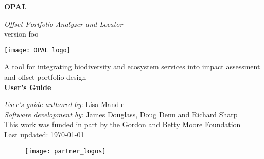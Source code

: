 
\begin{titlepage}
    \begin{center}
        \vspace*{1cm}
        
        {\Huge \textbf{OPAL}}
        
        \vspace{0.5cm}
        {\Large \em Offset Portfolio Analyzer and Locator}\\
        \vspace{0.25cm}
        {\large version foo}%
        
        \vspace{0.75cm}
        \texttt{[image: OPAL\_logo]}
        \vspace{0.75cm}
        
        {\Large A tool for integrating biodiversity and ecosystem services into impact assessment
        and offset portfolio design}\\
        \vspace{0.5cm}
        {\huge \textbf{User's Guide}}
      \end{center}        
        \vfill
        
        {\setlength{\parindent}{0cm}
        
        	{\em User's guide authored by}: Lisa Mandle\\
        	{\em Software development by}: James Douglass, Doug Denu and Richard Sharp\\
        	
        	This work was funded in part by the Gordon and Betty Moore Foundation\\
        	
        	Last updated: \today
        	
        }
        

        \begin{figure}[b]
        	\texttt{[image: partner\_logos]}
        \end{figure}
      
\end{titlepage}
